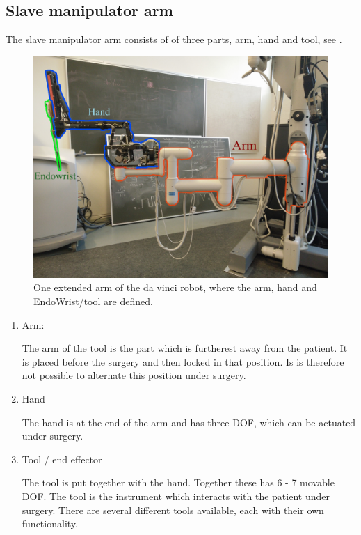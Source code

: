 \subsection*{Slave manipulator arm}
The slave manipulator arm consists of of three parts, arm, hand and tool, see .

\begin{figure}[H]
	\centering
		\centering
		\includegraphics[width=0.85\linewidth]{davincirobotarm_label.jpg}
		\caption{One extended arm of the da vinci robot, where the arm, hand and EndoWrist/tool are defined.}
		\label{fig:davinciarmrobot}
\end{figure}


\begin{enumerate}
\item Arm:

The arm of the tool is the part which is furtherest away from the patient. It is placed before the surgery and then locked in that position. Is is therefore not possible to alternate this position under surgery.
\item Hand

The hand is at the end of the arm and has three \gls{DOF}, which can be actuated under surgery.
\item Tool / end effector 

The tool is put together with the hand. Together these has 6 - 7 movable \gls{DOF}. The tool is the instrument which interacts with the patient under surgery. There are several different tools available, each with their own functionality. 
\end{enumerate}

